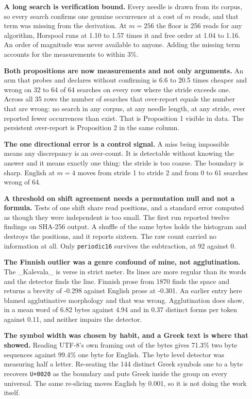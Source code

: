 \textbf{A long search is verification bound.} Every needle is drawn from its corpus, so every search confirms one genuine occurrence at a cost of \(m\) reads, and that term was missing from the derivation. At \(m = 256\) the floor is 256 reads for any algorithm, Horspool runs at 1.10 to 1.57 times it and free order at 1.04 to 1.16. An order of magnitude was never available to anyone. Adding the missing term accounts for the measurements to within 3\%.

\textbf{Both propositions are now measurements and not only arguments.} An arm that probes and declares without confirming is 6.6 to 20.5 times cheaper and wrong on 32 to 64 of 64 searches on every row where the stride exceeds one. Across all 35 rows the number of searches that over-report equals the number that are wrong: no search in any corpus, at any needle length, at any stride, ever reported fewer occurrences than exist. That is Proposition 1 visible in data. The persistent over-report is Proposition 2 in the same column.

\textbf{The one directional error is a control signal.} A miss being impossible means any discrepancy is an over-count. It is detectable without knowing the answer and it means exactly one thing: the stride is too coarse. The boundary is sharp. English at \(m = 4\) moves from stride 1 to stride 2 and from 0 to 61 searches wrong of 64.

\textbf{A threshold on shift agreement needs a permutation null and not a formula.} Tests of one shift share read positions, and a standard error computed as though they were independent is too small. The first run reported twelve findings on SHA-256 output. A shuffle of the same bytes holds the histogram and destroys the positions, and it reports sixteen. The raw count carried no information at all. Only \texttt{periodic16} survives the subtraction, at 92 against 0.

\textbf{The Finnish outlier was a genre confound of mine, not agglutination.} The \_Kalevala\_ is verse in strict meter. Its lines are more regular than its words and the detector finds the line. Finnish prose from 1870 finds the space and returns a brevity of -0.298 against English prose at -0.301. An earlier entry here blamed agglutinative morphology and that was wrong. Agglutination does show, in a mean word of 6.82 bytes against 4.94 and in 0.37 distinct forms per token against 0.11, and neither impairs the detector.

\textbf{The symbol width was chosen by habit, and a Greek text is where that showed.} Reading UTF-8's own framing out of the bytes gives 71.3\% two byte sequences against 99.4\% one byte for English. The byte level detector was measuring half a letter. Re-seating the 144 distinct Greek symbols one to a byte recovers \texttt{U+0020} as the boundary and puts Greek inside the group on every universal. The same re-slicing moves English by 0.001, so it is not doing the work itself.

